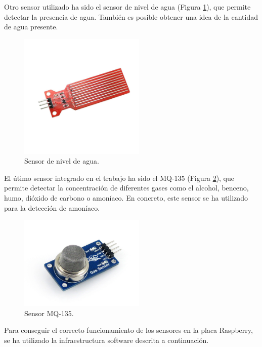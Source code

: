 Otro sensor utilizado ha sido el sensor de nivel de agua (Figura \ref{fig:nivel_of}), que permite detectar la presencia de agua. También es posible obtener una idea de la cantidad de agua presente.
\begin{figure} [h!]
  \begin{center}
    \includegraphics[width=6cm]{figs/nivel_of}
  \end{center}
  \caption{Sensor de nivel de agua.}
  \label{fig:nivel_of}
\end{figure}

El útimo sensor integrado en el trabajo ha sido el MQ-135 (Figura \ref{fig:mq_of}), que permite detectar la concentración de diferentes gases como el alcohol, benceno, humo, dióxido de carbono o amoníaco. En concreto, este sensor se ha utilizado para la detección de amoníaco.\\
\begin{figure} [h!]
  \begin{center}
    \includegraphics[width=6cm]{figs/mq_of}
  \end{center}
  \caption{Sensor MQ-135.}
  \label{fig:mq_of}
\end{figure}

Para conseguir el correcto funcionamiento de los sensores en la placa Raspberry, se ha utilizado la infraestructura software descrita a continuación.\\

